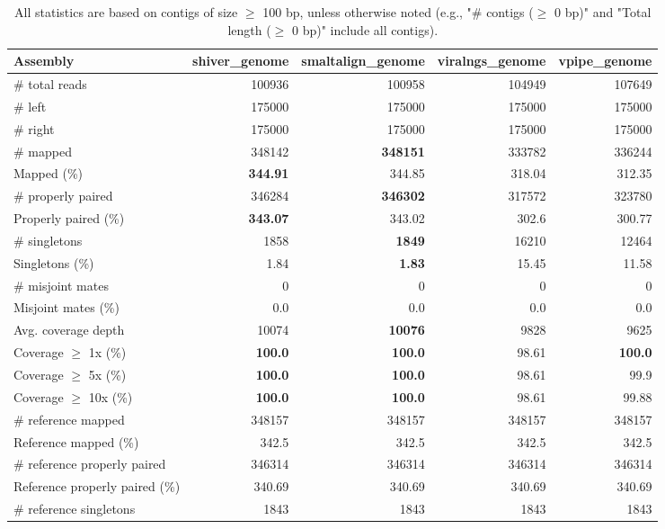 \documentclass[12pt,a4paper]{article}
\begin{document}
\begin{table}[ht]
\begin{center}
\caption{All statistics are based on contigs of size $\geq$ 100 bp, unless otherwise noted (e.g., "\# contigs ($\geq$ 0 bp)" and "Total length ($\geq$ 0 bp)" include all contigs).}
\begin{tabular}{|l*{4}{|r}|}
\hline
Assembly & shiver\_genome & smaltalign\_genome & viralngs\_genome & vpipe\_genome \\ \hline
\# total reads & 100936 & 100958 & 104949 & 107649 \\ \hline
\# left & 175000 & 175000 & 175000 & 175000 \\ \hline
\# right & 175000 & 175000 & 175000 & 175000 \\ \hline
\# mapped & 348142 & {\bf 348151} & 333782 & 336244 \\ \hline
Mapped (\%) & {\bf 344.91} & 344.85 & 318.04 & 312.35 \\ \hline
\# properly paired & 346284 & {\bf 346302} & 317572 & 323780 \\ \hline
Properly paired (\%) & {\bf 343.07} & 343.02 & 302.6 & 300.77 \\ \hline
\# singletons & 1858 & {\bf 1849} & 16210 & 12464 \\ \hline
Singletons (\%) & 1.84 & {\bf 1.83} & 15.45 & 11.58 \\ \hline
\# misjoint mates & 0 & 0 & 0 & 0 \\ \hline
Misjoint mates (\%) & 0.0 & 0.0 & 0.0 & 0.0 \\ \hline
Avg. coverage depth & 10074 & {\bf 10076} & 9828 & 9625 \\ \hline
Coverage $\geq$ 1x (\%) & {\bf 100.0} & {\bf 100.0} & 98.61 & {\bf 100.0} \\ \hline
Coverage $\geq$ 5x (\%) & {\bf 100.0} & {\bf 100.0} & 98.61 & 99.9 \\ \hline
Coverage $\geq$ 10x (\%) & {\bf 100.0} & {\bf 100.0} & 98.61 & 99.88 \\ \hline
\# reference mapped & 348157 & 348157 & 348157 & 348157 \\ \hline
Reference mapped (\%) & 342.5 & 342.5 & 342.5 & 342.5 \\ \hline
\# reference properly paired & 346314 & 346314 & 346314 & 346314 \\ \hline
Reference properly paired (\%) & 340.69 & 340.69 & 340.69 & 340.69 \\ \hline
\# reference singletons & 1843 & 1843 & 1843 & 1843 \\ \hline

\end{tabular}
\end{center}
\end{table}
\end{document}
